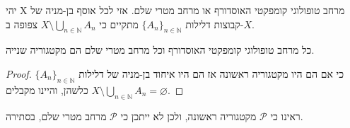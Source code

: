 \documentclass{tstextbook}
\begin{document}
\begin{theorem}
יהי X מרחב טופולוגי קומפקטי האוסדורף או מרחב מטרי שלם.
אזי לכל אוסף בן-מניה של קבוצות דלילות \(\{A_{n}\}_{n\in\mathbb{N}}\) מתקיים כי \(X\setminus\bigcup_{n\in\mathbb{N}}A_{n}\) צפופה ב-\(X\).

\end{theorem}
\begin{corollary}
כל מרחב טופולוגי קומפקטי האוסדורף וכל מרחב מטרי שלם הם מקטגוריה שנייה.

\end{corollary}
\begin{proof}
כי אם הם היו מקטגוריה ראשונה אז הם היו איחוד בן-מניה של דלילות \(\{A_{n}\}_{n\in\mathbb{N}}\) כלשהן, והיינו מקבלים \(X\setminus\bigcup_{n\in\mathbb{N}}A_{n}=\varnothing\).

\end{proof}
\begin{example}
ראינו כי \(\mathcal{P}\) מקטגוריה ראשונה, ולכן לא ייתכן כי \(\mathcal{P}\) מרחב מטרי שלם, בסתירה.

\end{example}
\end{document}
